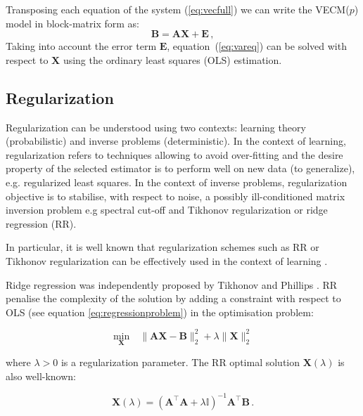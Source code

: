 Transposing each equation of the system (\ref{eq:vecfull}) we can write
the VECM($p$) model in block-matrix form as:
\begin{equation}\label{eq:vareq}
\mathbf{B} = 
\mathbf{A} \mathbf{X} + 
\mathbf{E} \, , 
\end{equation}
%
Taking into account the error term $\mathbf{E}$, equation~(\ref{eq:vareq}) 
can be solved with respect to $\mathbf{X}$ using the ordinary least
squares (OLS) estimation.


\subsection{Regularization}\label{sec:RR}

Regularization can be understood using two contexts: learning theory (probabilistic) and inverse problems (deterministic). In the context of learning, regularization refers to techniques allowing to avoid over-fitting and the desire property of the selected estimator is to perform well on new data (to generalize), e.g. regularized least squares. In the context of inverse problems, regularization objective is to stabilise, with respect to noise, a possibly ill-conditioned matrix inversion problem e.g spectral cut-off and Tikhonov regularization or ridge regression (RR)\cite{ tikhonov1977}.

In particular, it is well known that regularization schemes such as RR or Tikhonov regularization can be effectively used in the context of learning \cite{vito2005}.

Ridge regression was independently proposed by Tikhonov \cite{tikhonov1963} and Phillips \cite{phillips1962}. RR penalise the complexity of the  solution by adding a constraint with respect to OLS (see equation \ref{eq:regressionproblem}) in the optimisation problem:

\begin{equation}
\label{eq:RRproblem}
\underset{\mathbf{X}}{\text{min}} \quad \|
\mathbf{A}\mathbf{\mathbf{X}} - \mathbf{B} \|_2^2 +\lambda \|
\mathbf{\mathbf{X}}\|_2^2 
\end{equation}

\noindent where $\lambda>0$ is a regularization parameter. The RR optimal solution $\mathbf{X}(\lambda)$ is also well-known: 

\begin{equation}
\label{eq:optsolRR}
\mathbf{X}(\lambda)=(\mathbf{A}^\top \mathbf{A}+ \lambda
\mathbb{I})^{-1}\mathbf{A}^\top \mathbf{B} \, . 
\end{equation}

